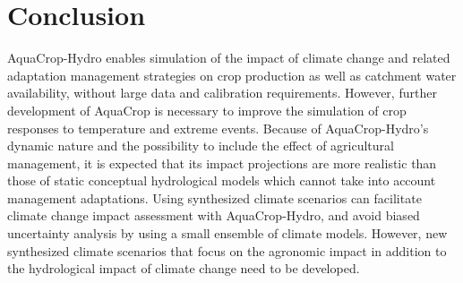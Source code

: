 \section{Conclusion}
AquaCrop-Hydro enables simulation of the impact of climate change and related adaptation management strategies on crop production as well as catchment water availability, without large data and calibration requirements. However, further development of AquaCrop is necessary to improve the simulation of crop responses to temperature and extreme events. Because of AquaCrop-Hydro's dynamic nature and the possibility to include the effect of agricultural management, it is expected that its impact projections are more realistic than those of static conceptual hydrological models which cannot take into account management adaptations. Using synthesized climate scenarios can facilitate climate change impact assessment with AquaCrop-Hydro, and avoid biased uncertainty analysis by using a small ensemble of climate models. However, new synthesized climate scenarios that focus on the agronomic impact in addition to the hydrological impact of climate change need to be developed.   


\cleardoublepage